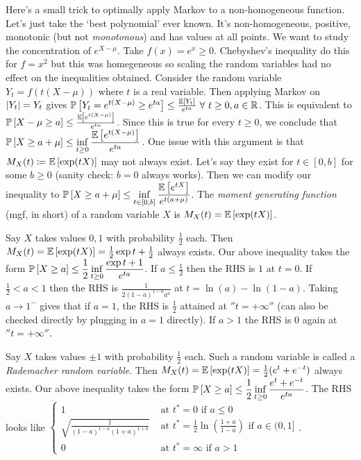 Here's a small trick to optimally apply Markov to a non-homogeneous function. Let's just take the `best polynomial' ever known. It's non-homogeneous, positive, monotonic (but not \textit{monotonous}) and has values at all points. We want to study the concentration of $e^{X-\mu}$. Take $f(x) = e^{x} \ge 0$. Chebyshev's inequality do this for $f=x^{2}$ but this was homegeneous so scaling the random variables had no effect on the inequalities obtained. Consider the random variable $Y_{t} = f(t(X-\mu))$ where $t$ is a real variable. Then applying Markov on $\displaystyle \left| Y_{t} \right| = Y_{t}$ gives $\mathbb P\left[ Y_{t} = e^{t(X-\mu)} \ge e^{ta} \right] \le \frac{\mathbb E\left[ Y_{t} \right]}{e^{ta}}~\forall~ t\ge 0, a\in\mathbb{R}$. This is equivalent to $\mathbb P\left[ X-\mu\ge a \right] \le \frac{\mathbb E\left[ e^{t(X-\mu)} \right]}{e^{ta}}$. Since this is true for every $t\ge 0$, we conclude that $\displaystyle\mathbb P\left[ X \ge a+\mu \right] \le \inf_{t\ge 0}\frac{\mathbb E\left[ e^{t(X-\mu)} \right]}{e^{ta}}$. One issue with this argument is that $M_{X}(t) \coloneqq \mathbb E\left[ \exp(tX) \right]$ may not always exist. Let's say they exist for $t\in [0,b]$ for some $b\ge 0$ (sanity check: $b=0$ always works). Then we can modify our inequality to $\displaystyle\mathbb P\left[ X\ge a+\mu \right] \le \inf_{t\in[0,b]}\frac{\mathbb E\left[ e^{tX} \right]}{e^{t(a+\mu)}}$. The \textit{moment generating function} (mgf, in short) of a random variable $X$ is $M_{X}(t) = \mathbb E\left[ \exp(tX) \right]$.


\begin{multicols}{2}


\begin{ex}[Bernouli]
Say $X$ takes values $0,1$ with probability $\frac12$ each. Then $M_{X}(t) = \mathbb E\left[ \exp(tX) \right] = \frac12 \exp t + \frac12$ always exists. Our above inequality takes the form $\displaystyle\mathbb P\left[ X \ge a \right] \le \frac12\inf_{t\ge 0}\frac{\exp t + 1}{e^{ta}}$. If $a \le \frac12$ then the RHS is $1$ at $t=0$. If $\frac12 < a < 1$ then the RHS is $\frac{1}{2(1-a)^{1-a}a^{a}}$ at $t = \ln(a)-\ln(1-a)$. Taking $a\to 1^{-}$ gives that if $a=1$, the RHS is $\frac12$ attained at $''t = +\infty''$ (can also be checked directly by plugging in $a=1$ directly). If $a>1$ the RHS is $0$ again at $''t = +\infty''$.\end{ex}
\vfill

\begin{ex}[Rademacher]\label{rade}
Say $X$ takes values $\pm1$ with probability $\frac12$ each. Such a random variable is called a \textit{Rademacher random variable}. Then $M_{X}(t) = \mathbb E\left[ \exp(tX) \right] = \frac12(e^{t} + e^{-t})$ always exists. Our above inequality takes the form $\displaystyle\mathbb P\left[ X \ge a \right] \le \frac12\inf_{t\ge 0}\frac{e^{t} + e^{-t}}{e^{ta}}$. The RHS looks like $\begin{cases}
1 &\text{ at } t^{*}=0  \text{ if } a\le 0\\
\sqrt{\frac{1}{(1-a)^{1-a}(1+a)^{1+a}}} &\text{ at } t^{*}=\frac12\ln\left(\frac{1+a}{1-a}\right)  \text{ if } a \in (0,1]\\
0 &\text{ at } t^{*}=\infty  \text{ if } a > 1
\end{cases}$.
\end{ex}
\end{multicols}



